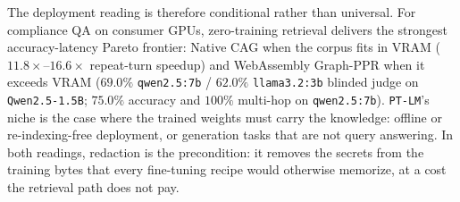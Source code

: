 \documentclass{article}
\begin{document}
The deployment reading is therefore conditional rather than universal. For compliance QA on consumer GPUs, zero-training retrieval delivers the strongest accuracy-latency Pareto frontier: Native CAG when the corpus fits in VRAM ($11.8\times$--$16.6\times$ repeat-turn speedup) and WebAssembly Graph-PPR when it exceeds VRAM ($69.0\%$ \texttt{qwen2.5:7b} / $62.0\%$ \texttt{llama3.2:3b} blinded judge on \texttt{Qwen2.5-1.5B}; $75.0\%$ accuracy and $100\%$ multi-hop on \texttt{qwen2.5:7b}). \texttt{PT-LM}'s niche is the case where the trained weights must carry the knowledge: offline or re-indexing-free deployment, or generation tasks that are not query answering. In both readings, redaction is the precondition: it removes the secrets from the training bytes that every fine-tuning recipe would otherwise memorize, at a cost the retrieval path does not pay.



\end{document}
